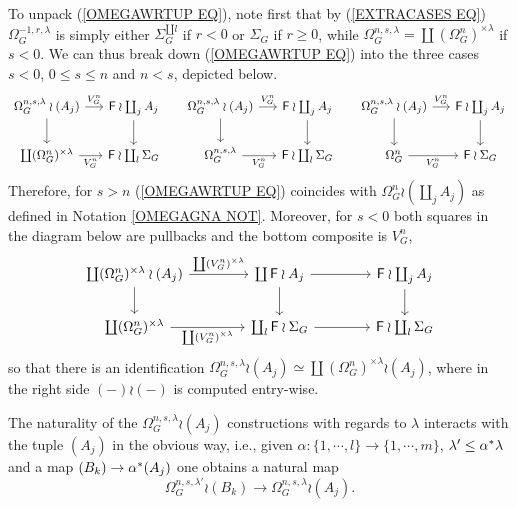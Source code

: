 \documentclass[a4paper,10pt]{article}%
\begin{document}
\begin{remark}
To unpack (\ref{OMEGAWRTUP EQ}),
note first that by (\ref{EXTRACASES EQ}) $\Omega_G^{-1,r,\lambda}$ is simply either 
$\Sigma_G^{\amalg l}$ if $r<0$ or 
$\Sigma_G$ if $r \geq 0$,
while $\Omega_G^{n,s,\lambda} = \coprod (\Omega_{G}^{n})^{\times \lambda}$ if $s<0$.
We can thus break down
(\ref{OMEGAWRTUP EQ})
into the three cases
$s<0$, $0 \leq s \leq n$ and $n < s$,
depicted below.
\begin{equation}
\begin{tikzcd}[column sep =1.4em]
	\Omega_{G}^{n,s,\lambda} \wr (A_j) \ar{r}{V_{G}^{n}} \ar{d}& 
	\Fin \wr \coprod_j A_j \ar{d}
&
	\Omega_{G}^{n,s,\lambda} \wr (A_j) \ar{r}{V_{G}^{n}} \ar{d}& 
	\Fin \wr \coprod_j A_j \ar{d}
&
	\Omega_{G}^{n,s,\lambda} \wr (A_j) \ar{r}{V_{G}^{n}} \ar{d}& 
	\Fin \wr \coprod_j A_j \ar{d}
\\
	\coprod (\Omega_{G}^{n})^{\times \lambda} \ar{r}[swap]{V_{G}^{n}} &
	\Fin \wr \coprod_l \Sigma_G
&
	\Omega_{G}^{n,s,\lambda} \ar{r}[swap]{V_{G}^{n}} &
	\Fin \wr \coprod_l \Sigma_G
&
	\Omega_{G}^{n} \ar{r}[swap]{V_{G}^{n}} &
	\Fin \wr \Sigma_G
\end{tikzcd}
\end{equation}
Therefore, for $s>n$ (\ref{OMEGAWRTUP EQ}) 
coincides with 
$\Omega_G^{n} \wr (\coprod_j A_j)$
as defined in Notation \ref{OMEGAGNA NOT}.
Moreover, for $s<0$ both squares in the diagram below
are pullbacks and the bottom composite is $V_G^n$,
\begin{equation}\label{BOTTOM EQ}
\begin{tikzcd}[column sep = 4em]
	\coprod (\Omega_{G}^{n})^{\times \lambda} \wr (A_j) 
	\ar{r}{\coprod (V_{G}^{n})^{\times \lambda}} \ar{d}&
	\coprod \Fin \wr A_j \ar{r} \ar{d} & 
	\Fin \wr \coprod_j A_j \ar{d}
\\
	\coprod (\Omega_{G}^{n})^{\times \lambda} \ar{r}[swap]{\coprod (V_{G}^{n})^{\times \lambda}} &
	\coprod_l \Fin \wr \Sigma_G \ar{r} &
	\Fin \wr \coprod_l \Sigma_G
\end{tikzcd}
\end{equation}
so that there is an identification
$\Omega_{G}^{n,s,\lambda} \wr (A_j)\simeq 
\coprod (\Omega_{G}^{n})^{\times \lambda} \wr (A_j)$, 
where in the right side $(\minus)\wr (\minus)$ is computed entry-wise.
\end{remark}

\begin{remark} \label{NATTLABEL REM}
The naturality of
the $\Omega_{G}^{n,s,\lambda} \wr (A_j)$ constructions
with regards to $\lambda$ interacts with the tuple $(A_j)$
in the obvious way, i.e.,
given $\alpha \colon \{1,\cdots,l\} \to \{1,\cdots,m\}$,
$\lambda' \leq \alpha^{\**} \lambda$
and a map $(B_k) \to \alpha^{\**}(A_j)$ one obtains a natural map
\[\Omega_{G}^{n,s,\lambda'} \wr (B_k) \to 
\Omega_{G}^{n,s,\lambda} \wr (A_j).\]
\end{remark}
\end{document}
